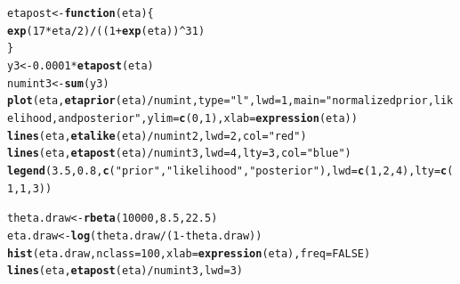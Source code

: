 \documentclass[12pt]{article}\usepackage[]{graphicx}\usepackage[]{color}
\makeatletter
\newcommand{\hlnum}[1]{\textcolor[rgb]{0.686,0.059,0.569}{#1}}%
\newcommand{\hlstr}[1]{\textcolor[rgb]{0.192,0.494,0.8}{#1}}%
\newcommand{\hlopt}[1]{\textcolor[rgb]{0,0,0}{#1}}%
\newcommand{\hlstd}[1]{\textcolor[rgb]{0.345,0.345,0.345}{#1}}%
\newcommand{\hlkwa}[1]{\textcolor[rgb]{0.161,0.373,0.58}{\textbf{#1}}}%
\newcommand{\hlkwb}[1]{\textcolor[rgb]{0.69,0.353,0.396}{#1}}%
\newcommand{\hlkwc}[1]{\textcolor[rgb]{0.333,0.667,0.333}{#1}}%
\newcommand{\hlkwd}[1]{\textcolor[rgb]{0.737,0.353,0.396}{\textbf{#1}}}%
\newenvironment{kframe}{%
 \def\at@end@of@kframe{}%
 \ifinner\ifhmode%
  \def\at@end@of@kframe{\end{minipage}}%
  \begin{minipage}{\columnwidth}%
 \fi\fi%
 \def\FrameCommand##1{\hskip\@totalleftmargin \hskip-\fboxsep
 \colorbox{shadecolor}{##1}\hskip-\fboxsep
     \hskip-\linewidth \hskip-\@totalleftmargin \hskip\columnwidth}%
 \MakeFramed {\advance\hsize-\width
   \@totalleftmargin\z@ \linewidth\hsize
   \@setminipage}}%
 {\par\unskip\endMakeFramed%
 \at@end@of@kframe}
\newenvironment{knitrout}{}{} %
\makeatother
\begin{document}
\begin{knitrout}\footnotesize
{}\color{fgcolor}\begin{kframe}
\begin{alltt}
\hlstd{etapost} \hlkwb{<-} \hlkwa{function}\hlstd{(}\hlkwc{eta}\hlstd{)\{}
  \hlkwd{exp}\hlstd{(}\hlnum{17}\hlopt{*}\hlstd{eta}\hlopt{/}\hlnum{2}\hlstd{)}\hlopt{/}\hlstd{((}\hlnum{1}\hlopt{+}\hlkwd{exp}\hlstd{(eta))}\hlopt{^}\hlnum{31}\hlstd{)}
\hlstd{\}}
\hlstd{y3} \hlkwb{<-} \hlnum{0.0001}\hlopt{*}\hlkwd{etapost}\hlstd{(eta)}
\hlstd{numint3} \hlkwb{<-} \hlkwd{sum}\hlstd{(y3)}
\hlkwd{plot}\hlstd{(eta,} \hlkwd{etaprior}\hlstd{(eta)}\hlopt{/}\hlstd{numint,} \hlkwc{type}\hlstd{=}\hlstr{"l"}\hlstd{,} \hlkwc{lwd}\hlstd{=}\hlnum{1}\hlstd{,} \hlkwc{main}\hlstd{=}\hlstr{"normalized prior, likelihood, and posterior"}\hlstd{,} \hlkwc{ylim}\hlstd{=}\hlkwd{c}\hlstd{(}\hlnum{0}\hlstd{,}\hlnum{1}\hlstd{),} \hlkwc{xlab}\hlstd{=}\hlkwd{expression}\hlstd{(eta))}
\hlkwd{lines}\hlstd{(eta,} \hlkwd{etalike}\hlstd{(eta)}\hlopt{/}\hlstd{numint2,} \hlkwc{lwd}\hlstd{=}\hlnum{2}\hlstd{,} \hlkwc{col}\hlstd{=}\hlstr{"red"}\hlstd{)}
\hlkwd{lines}\hlstd{(eta,} \hlkwd{etapost}\hlstd{(eta)}\hlopt{/}\hlstd{numint3,} \hlkwc{lwd}\hlstd{=}\hlnum{4}\hlstd{,} \hlkwc{lty}\hlstd{=}\hlnum{3}\hlstd{,} \hlkwc{col}\hlstd{=}\hlstr{"blue"}\hlstd{)}
\hlkwd{legend}\hlstd{(}\hlnum{3.5}\hlstd{,} \hlnum{0.8}\hlstd{,} \hlkwd{c}\hlstd{(}\hlstr{"prior"}\hlstd{,} \hlstr{"likelihood"}\hlstd{,} \hlstr{"posterior"}\hlstd{),} \hlkwc{lwd}\hlstd{=}\hlkwd{c}\hlstd{(}\hlnum{1}\hlstd{,}\hlnum{2}\hlstd{,}\hlnum{4}\hlstd{),} \hlkwc{lty}\hlstd{=}\hlkwd{c}\hlstd{(}\hlnum{1}\hlstd{,}\hlnum{1}\hlstd{,}\hlnum{3}\hlstd{))}
\end{alltt}
\end{kframe}
\end{knitrout}

\begin{knitrout}\footnotesize
{}\color{fgcolor}\begin{kframe}
\begin{alltt}
\hlstd{theta.draw} \hlkwb{<-} \hlkwd{rbeta}\hlstd{(}\hlnum{10000}\hlstd{,} \hlnum{8.5}\hlstd{,} \hlnum{22.5}\hlstd{)}
\hlstd{eta.draw} \hlkwb{<-} \hlkwd{log}\hlstd{(theta.draw}\hlopt{/}\hlstd{(}\hlnum{1}\hlopt{-}\hlstd{theta.draw))}
\hlkwd{hist}\hlstd{(eta.draw,} \hlkwc{nclass}\hlstd{=}\hlnum{100}\hlstd{,} \hlkwc{xlab}\hlstd{=}\hlkwd{expression}\hlstd{(eta),} \hlkwc{freq}\hlstd{=}\hlnum{FALSE}\hlstd{)}
\hlkwd{lines}\hlstd{(eta,} \hlkwd{etapost}\hlstd{(eta)}\hlopt{/}\hlstd{numint3,} \hlkwc{lwd}\hlstd{=}\hlnum{3}\hlstd{)}
\end{alltt}
\end{kframe}
\end{knitrout}
\end{document}
